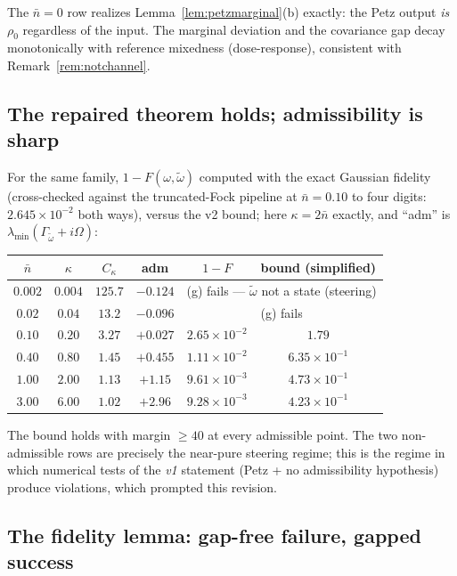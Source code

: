 \documentclass[11pt,a4paper]{article}
\theoremstyle{plain}
\theoremstyle{definition}
\theoremstyle{remark}
\newcommand{\Ckappa}{C_{\kappa}}
\begin{document}
The $\bar{n} = 0$ row realizes Lemma~\ref{lem:petzmarginal}(b) exactly: the Petz
output \emph{is} $\rho_0$ regardless of the input. The marginal deviation and the
covariance gap decay monotonically with reference mixedness (dose-response),
consistent with Remark~\ref{rem:notchannel}.

\subsection{The repaired theorem holds; admissibility is sharp}

For the same family, $1 - F(\omega, \tilde{\omega})$ computed with the exact
Gaussian fidelity (cross-checked against the truncated-Fock pipeline at
$\bar{n} = 0.10$ to four digits: $2.645 \times 10^{-2}$ both ways), versus the v2
bound; here $\kappa = 2\bar{n}$ exactly, and ``adm'' is
$\lambda_{\min}(\Gamma_{\tilde{\omega}} + i\Omega)$:

\begin{center}
\begin{tabular}{c|c|c|c|c|c}
$\bar{n}$ & $\kappa$ & $\Ckappa$ & adm & $1 - F$ & bound (simplified) \\
\hline
$0.002$ & $0.004$ & $125.7$ & $-0.124$ & \multicolumn{2}{c}{(g) fails ---
$\tilde{\omega}$ not a state (steering)} \\
$0.02$ & $0.04$ & $13.2$ & $-0.096$ & \multicolumn{2}{c}{(g) fails} \\
$0.10$ & $0.20$ & $3.27$ & $+0.027$ & $2.65 \times 10^{-2}$ & $1.79$ \\
$0.40$ & $0.80$ & $1.45$ & $+0.455$ & $1.11 \times 10^{-2}$ & $6.35 \times 10^{-1}$ \\
$1.00$ & $2.00$ & $1.13$ & $+1.15$ & $9.61 \times 10^{-3}$ & $4.73 \times 10^{-1}$ \\
$3.00$ & $6.00$ & $1.02$ & $+2.96$ & $9.28 \times 10^{-3}$ & $4.23 \times 10^{-1}$
\end{tabular}
\end{center}

The bound holds with margin $\ge 40$ at every admissible point. The two
non-admissible rows are precisely the near-pure steering regime; this is the
regime in which numerical tests of the \emph{v1} statement (Petz +
no admissibility hypothesis) produce violations, which prompted this revision.

\subsection{The fidelity lemma: gap-free failure, gapped success}
\end{document}
